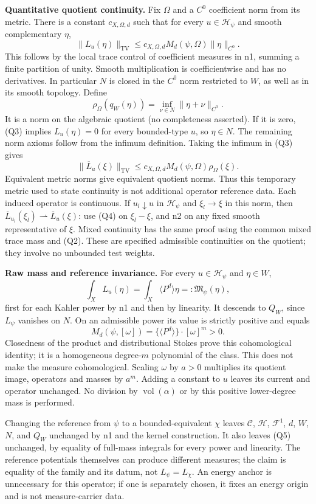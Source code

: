 \documentclass[
  11pt,
]{article}
\begin{document}
\textbf{Quantitative quotient continuity.} Fix \(\Omega\) and a \(C^0\)
coefficient norm from its metric. There is a constant \(c_{X,\Omega,d}\)
such that for every \(u\in\mathcal H_\psi\) and smooth complementary
\(\eta\), \[
\|L_u(\eta)\|_{\mathrm{TV}}\leq c_{X,\Omega,d}M_d(\psi,\Omega)\|\eta\|_{C^0}. \tag{Q3}
\] This follows by the local trace control of coefficient measures in
n1, summing a finite partition of unity. Smooth multiplication is
coefficientwise and has no derivatives. In particular \(N\) is closed in
the \(C^0\) norm restricted to \(W\), as well as in its smooth topology.
Define \[
\rho_\Omega(q_W(\eta))=\inf_{\nu\in N}\|\eta+\nu\|_{C^0}.
\] It is a norm on the algebraic quotient (no completeness asserted). If
it is zero, (Q3) implies \(L_u(\eta)=0\) for every bounded-type \(u\),
so \(\eta\in N\). The remaining norm axioms follow from the infimum
definition. Taking the infimum in (Q3) gives \[
\|\overline L_u(\xi)\|_{\mathrm{TV}}\leq c_{X,\Omega,d}M_d(\psi,\Omega)\rho_\Omega(\xi). \tag{Q4}
\] Equivalent metric norms give equivalent quotient norms. Thus this
temporary metric used to state continuity is not additional operator
reference data. Each induced operator is continuous. If
\(u_l\downarrow u\) in \(\mathcal H_\psi\) and \(\xi_l\to\xi\) in this
norm, then
\(\overline L_{u_l}(\xi_l)\rightharpoonup\overline L_u(\xi)\): use (Q4)
on \(\xi_l-\xi\), and n2 on any fixed smooth representative of \(\xi\).
Mixed continuity has the same proof using the common mixed trace mass
and (Q2). These are specified admissible continuities on the quotient;
they involve no unbounded test weights.

\textbf{Raw mass and reference invariance.} For every
\(u\in\mathcal H_\psi\) and \(\eta\in W\), \[
\int_X L_u(\eta)=\int_X\langle P^d\rangle\eta=:\mathfrak M_\psi(\eta), \tag{Q5}
\] first for each Kahler power by n1 and then by linearity. It descends
to \(Q_W\), since \(L_\psi\) vanishes on \(N\). On an admissible power
its value is strictly positive and equals \[
M_d(\psi,[\omega])=\{\langle P^d\rangle\}\cdot[\omega]^m>0.
\] Closedness of the product and distributional Stokes prove this
cohomological identity; it is a homogeneous degree-\(m\) polynomial of
the class. This does not make the measure cohomological. Scaling
\(\omega\) by \(a>0\) multiplies its quotient image, operators and
masses by \(a^m\). Adding a constant to \(u\) leaves its current and
operator unchanged. No division by \(\operatorname{vol}(\alpha)\) or by
this positive lower-degree mass is performed.

Changing the reference from \(\psi\) to a bounded-equivalent \(\chi\)
leaves \(\mathcal C\), \(\mathcal H\), \(\mathcal F^1\), \(d\), \(W\),
\(N\), and \(Q_W\) unchanged by n1 and the kernel construction. It also
leaves (Q5) unchanged, by equality of full-mass integrals for every
power and linearity. The reference potentials themselves can produce
different measures; the claim is equality of the family and its datum,
not \(L_\psi=L_\chi\). An energy anchor is unnecessary for this
operator; if one is separately chosen, it fixes an energy origin and is
not measure-carrier data.
\end{document}

